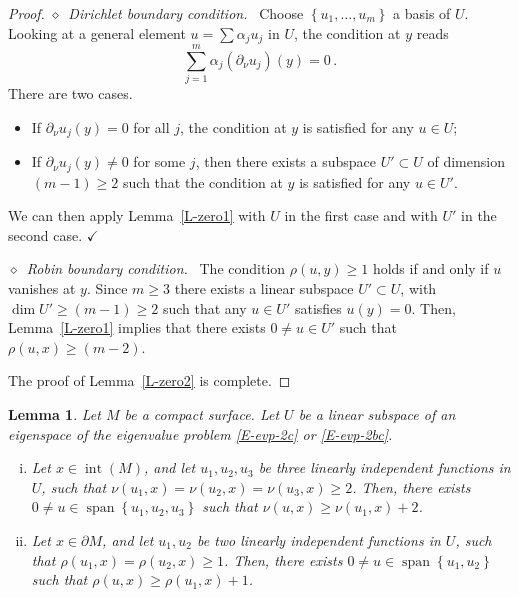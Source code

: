 \documentclass[12pt,a4paper]{amsart}
\theoremstyle{plain} %
\newtheorem{lemma}[theorem]{Lemma}
\theoremstyle{definition}
\numberwithin{equation}{section}
\numberwithin{figure}{section}
\numberwithin{table}{section}
\DeclareMathOperator{\inte}{int}
\DeclareMathOperator{\spanop}{span}
\newcommand{\qedc}{$\checkmark$}
\newcommand{\set}[1]{\left\lbrace #1 \right\rbrace}
\newcommand{\noid}{\noindent $\diamond$~}
\begin{document}
\begin{proof}\phantom{}

\emph{\noid Dirichlet boundary condition.}~ Choose $\set{u_1,\ldots, u_m}$ a basis of $U$. Looking at a general element $u=\sum \alpha_j u_j$ in $U$, the condition at $y$ reads
%
$$
\sum_{j=1}^m  \alpha_j (\partial_\nu u_j)(y) =0\,.
$$
%
There are two cases.
\begin{itemize}
\item If $\partial_\nu u_j(y) =0$ for all $j$, the condition at $y$ is satisfied for any $u\in U$;
\item If $\partial_\nu u_j(y) \neq 0$ for some $j$, then there exists a subspace $U'\subset U$ of dimension $(m-1) \ge 2$ such that the condition at $y$ is satisfied for any $u\in U'$.
\end{itemize}
We can then apply Lemma~\ref{L-zero1} with $U$ in the first case and with $U'$ in the second case. \hspace{1cm} \qedc \smallskip

\emph{\noid Robin boundary condition.}~ The condition $\rho(u,y) \ge 1$ holds if and only if $u$ vanishes at $y$. Since $m \ge 3$ there exists a linear subspace $U' \subset U$, with $\dim U' \ge (m-1) \ge 2$ such that any $u \in U'$ satisfies $u(y) = 0$. Then, Lemma~\ref{L-zero1} implies that there exists $0 \neq u \in U'$ such that $\rho(u,x) \ge (m-2)$.


The proof of Lemma~\ref{L-zero2} is complete.
\end{proof}


\begin{lemma}\label{L-zeroc}
Let $M$ be a compact surface. Let $U$ be a linear subspace of an eigen\-space of the eigenvalue problem \eqref{E-evp-2c} or \eqref{E-evp-2bc}.
\begin{enumerate}[(i)]
  \item Let $x \in \inte(M)$, and let $u_1, u_2, u_3$ be three linearly independent functions in $U$, such that $ \nu(u_1,x) = \nu(u_2,x) = \nu(u_3,x) \ge 2$. Then, there exists $0 \neq u \in \spanop\set{u_1,u_2,u_3}$ such that $\nu(u,x) \ge \nu(u_1,x) + 2$.
  \item Let $x \in \partial M$, and let $u_1, u_2$ be two linearly independent functions in $U$, such that $ \rho(u_1,x) = \rho(u_2,x) \ge 1$. Then, there exists $0 \neq u \in \spanop\set{u_1,u_2}$ such that $\rho(u,x) \ge \rho(u_1,x) + 1$.
\end{enumerate}
\end{lemma}%
\end{document}
